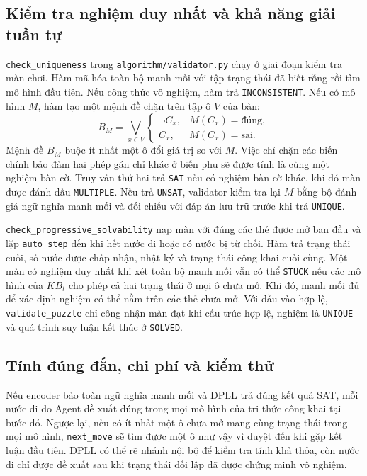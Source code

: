 \subsection{Kiểm tra nghiệm duy nhất và khả năng giải tuần tự}

\texttt{check\_uniqueness} trong \texttt{algorithm/validator.py} chạy ở
giai đoạn kiểm tra màn chơi. Hàm mã hóa toàn bộ manh mối với tập trạng thái
đã biết rỗng rồi tìm mô hình đầu tiên. Nếu công thức vô nghiệm, hàm trả
\texttt{INCONSISTENT}. Nếu có mô hình $M$, hàm tạo một mệnh đề chặn trên
tập ô $V$ của bàn:
\[
B_M =
\bigvee_{x\in V}
\begin{cases}
    \neg C_x, & M(C_x)=\text{đúng},\\
    C_x, & M(C_x)=\text{sai}.
\end{cases}
\]
Mệnh đề $B_M$ buộc ít nhất một ô đổi giá trị so với $M$. Việc chỉ chặn các
biến chính bảo đảm hai phép gán chỉ khác ở biến phụ sẽ được tính là cùng
một nghiệm bàn cờ. Truy vấn thứ hai trả \texttt{SAT} nếu có nghiệm bàn cờ
khác, khi đó màn được đánh dấu \texttt{MULTIPLE}. Nếu trả \texttt{UNSAT},
validator kiểm tra lại $M$ bằng bộ đánh giá ngữ nghĩa manh mối và đối
chiếu với đáp án lưu trữ trước khi trả \texttt{UNIQUE}.

\texttt{check\_progressive\_solvability} nạp màn với đúng các thẻ được mở
ban đầu và lặp \texttt{auto\_step} đến khi hết nước đi hoặc có nước bị từ
chối. Hàm trả trạng thái cuối, số nước được chấp nhận, nhật ký và trạng
thái công khai cuối cùng. Một màn có nghiệm duy nhất khi xét toàn bộ manh
mối vẫn có thể \texttt{STUCK} nếu các mô hình của $KB_t$ cho phép cả hai
trạng thái ở mọi ô chưa mở. Khi đó, manh mối đủ để xác định nghiệm có thể
nằm trên các thẻ chưa mở. Với đầu vào hợp lệ, \texttt{validate\_puzzle} chỉ
công nhận màn đạt khi cấu trúc hợp lệ, nghiệm là \texttt{UNIQUE} và quá
trình suy luận kết thúc ở \texttt{SOLVED}.

\subsection{Tính đúng đắn, chi phí và kiểm thử}

Nếu encoder bảo toàn ngữ nghĩa manh mối và DPLL trả đúng kết quả SAT,
mỗi nước đi do Agent đề xuất đúng trong mọi mô hình của tri thức công khai
tại bước đó. Ngược lại, nếu có ít nhất một ô chưa mở mang cùng trạng thái
trong mọi mô hình, \texttt{next\_move} sẽ tìm được một ô như vậy vì duyệt
đến khi gặp kết luận đầu tiên. DPLL có thể rẽ nhánh nội bộ để kiểm tra tính
khả thỏa, còn nước đi chỉ được đề xuất sau khi trạng thái đối lập đã được
chứng minh vô nghiệm.

